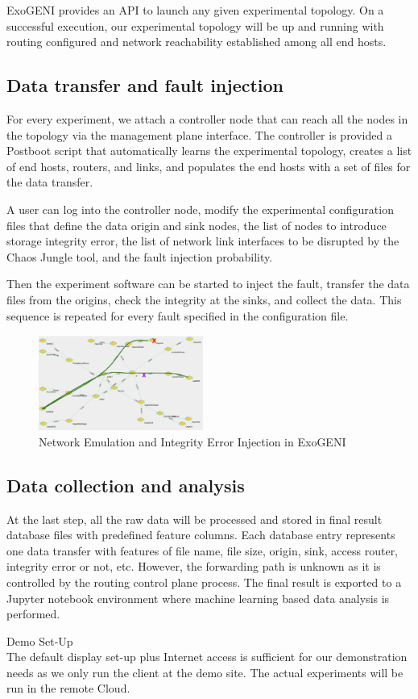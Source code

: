 ExoGENI provides an API to launch any given experimental topology. On a successful execution, our experimental topology will be up and running with routing configured and network reachability established among all end hosts.   

\subsection{Data transfer and fault injection}
For every experiment, we attach a controller node that can reach all the nodes in the topology via the management plane interface. The controller is provided a Postboot script that automatically learns the experimental topology, creates a list of end hosts, routers, and links, and populates the end hosts with a set of files for the data transfer.

A user can log into the controller node, modify the experimental configuration files that define the data origin and sink nodes, the list of nodes to introduce storage integrity error, the list of network link interfaces to be disrupted by the Chaos Jungle tool, and the fault injection probability.

Then the experiment software can be started to inject the fault, transfer the data files from the origins, check the integrity at the sinks, and collect the data. This sequence is repeated for every fault specified in the configuration file.

\begin{figure}[!ht]
\begin{center}
\includegraphics[width=0.48\textwidth]{./figure/ChaosJungle}
\end{center}
\caption{Network Emulation and Integrity Error Injection in ExoGENI}
\label{fig:chaosjungle}
\end{figure}

\subsection{Data collection and analysis}
At the last step, all the raw data will be processed and stored in final result database files with predefined feature columns. Each database entry represents one data transfer with features of file name, file size, origin, sink, access router, integrity error or not, etc. However, the forwarding path is unknown as it is controlled by the routing control plane process. The final result is exported to a Jupyter notebook environment where machine learning based data analysis is performed.

\hfill \break

{\LARGE Demo Set-Up}\\

The default display set-up plus Internet access is sufficient for our demonstration needs as we only run the client at the demo site. The actual experiments will be run in the remote Cloud.

